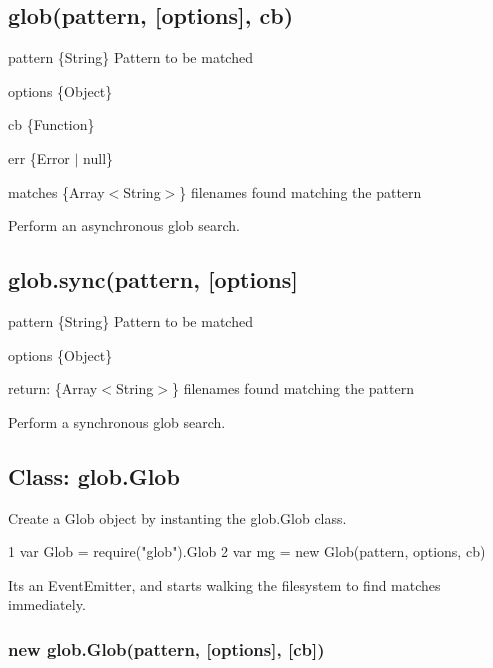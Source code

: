 \subsection*{glob(pattern, \mbox{[}options\mbox{]}, cb)}


\begin{DoxyItemize}
\item {\ttfamily pattern} \{String\} Pattern to be matched
\item {\ttfamily options} \{Object\}
\item {\ttfamily cb} \{Function\}
\begin{DoxyItemize}
\item {\ttfamily err} \{Error $\vert$ null\}
\item {\ttfamily matches} \{Array$<$\+String$>$\} filenames found matching the pattern
\end{DoxyItemize}
\end{DoxyItemize}

Perform an asynchronous glob search.

\subsection*{glob.\+sync(pattern, \mbox{[}options\mbox{]}}


\begin{DoxyItemize}
\item {\ttfamily pattern} \{String\} Pattern to be matched
\item {\ttfamily options} \{Object\}
\item return\+: \{Array$<$\+String$>$\} filenames found matching the pattern
\end{DoxyItemize}

Perform a synchronous glob search.

\subsection*{Class\+: glob.\+Glob}

Create a Glob object by instanting the {\ttfamily glob.\+Glob} class.


\begin{DoxyCode}
1 var Glob = require("glob").Glob
2 var mg = new Glob(pattern, options, cb)
\end{DoxyCode}


It\textquotesingle{}s an Event\+Emitter, and starts walking the filesystem to find matches immediately.

\subsubsection*{new glob.\+Glob(pattern, \mbox{[}options\mbox{]}, \mbox{[}cb\mbox{]})}


